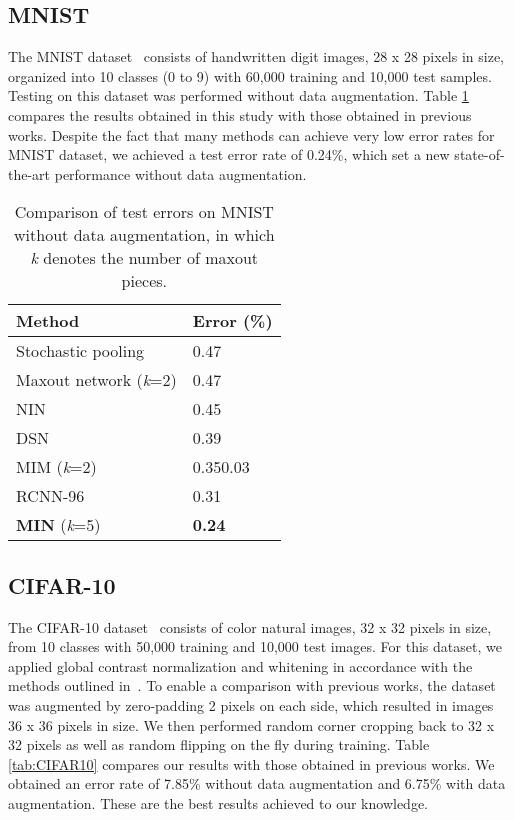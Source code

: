 \documentclass[10pt,twocolumn,letterpaper]{article}
\begin{document}
\subsection{MNIST}
The MNIST dataset~\cite{lecun1998gradient} consists of handwritten digit images, 28 x 28 pixels in size, organized into 10 classes (0 to 9) with 60,000 training and 10,000 test samples. 
Testing on this dataset was performed without data augmentation.
Table \ref{tab:MNIST} compares the results obtained in this study with those obtained in previous works.
Despite the fact that many methods can achieve very low error rates for MNIST dataset, we achieved a test error rate of 0.24\%, which set a new state-of-the-art performance without data augmentation. 

\begin{table}
\begin{center}
\caption{Comparison of test errors on MNIST without data augmentation, in which \textit{k} denotes the number of maxout pieces.}
\begin{tabular}{|p{1.6in}|p{0.6in}|} \hline 
Method & Error (\%) \\ \hline 
Stochastic pooling \cite{zeiler2013stochastic} & 0.47 \\ \hline 
Maxout network (\textit{k}=2) \cite{goodfellow2013maxout} & 0.47 \\ \hline 
NIN \cite{DBLP:journals/corr/LinCY13} & 0.45 \\ \hline 
DSN  \cite{lee2014deeply} & 0.39 \\ \hline 
MIM (\textit{k}=2) \cite{liao2015importance} & 0.350.03 \\ \hline 
RCNN-96~\cite{Liang_2015_CVPR} & 0.31 \\ \hline
\textbf{MIN} (\textit{k}=5)\textbf{} & \textbf{0.24} \\ \hline
\end{tabular}
\label{tab:MNIST}
\end{center}
\end{table}



\subsection{CIFAR-10}
The CIFAR-10 dataset~\cite{krizhevsky2009learning} consists of color natural images, 32 x 32 pixels in size, from 10 classes with 50,000 training and 10,000 test images. For this dataset, we applied global contrast normalization and whitening in accordance with the methods outlined in~\cite{goodfellow2013maxout}. To enable a comparison with previous works, the dataset was augmented by zero-padding 2 pixels on each side, which resulted in images 36 x 36 pixels in size. We then performed random corner cropping back to 32 x 32 pixels as well as random flipping on the fly during training.
Table \ref{tab:CIFAR10} compares our results with those obtained in previous works.
We obtained an error rate of 7.85\% without data augmentation and 6.75\% with data augmentation. These are the best results achieved to our knowledge. 
\end{document}
